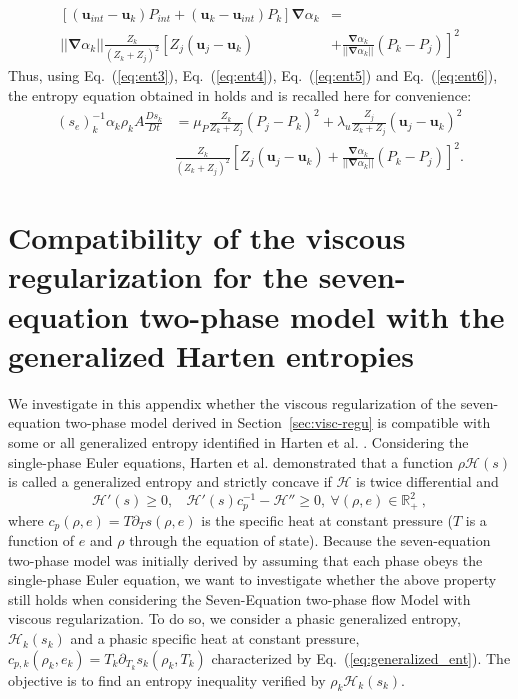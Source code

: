 \documentclass[preprint,10pt]{elsarticle}
\newcommand{\grad}{\mbold{\nabla}}
\newcommand{\mbold}[1]{\boldsymbol#1}
\newcommand{\eqt}[1]{Eq.~(\ref{#1})}                     %
\newcommand{\sct}[1]{Section~\ref{#1}}                   %
\begin{document}
\begin{appendices}
\begin{align}
\label{eq:ent6}
\left[ (\mbold u_{int}-\mbold u_k)P_{int} + (\mbold u_k-\mbold u_{int})P_k \right] \grad \alpha_k &=  \nonumber \\
|| \grad \alpha_k || \frac{Z_k }{\left( Z_k+Z_j \right)^2} \left[ Z_j (\mbold u_j-\mbold u_k)\right.&+\left.\frac{\grad \alpha_k}{|| \grad \alpha_k ||}(P_k-P_j)\right]^2
\end{align}
Thus, using \eqt{eq:ent3}, \eqt{eq:ent4}, \eqt{eq:ent5} and \eqt{eq:ent6}, the entropy equation obtained in \cite{SEM} holds and is recalled here for convenience:
\begin{align}
(s_{e})_k^{-1} \alpha_k \rho_k A \frac{Ds_k}{Dt} &= \mu_P \frac{Z_k}{Z_k+Z_j} (P_j - P_k)^2 + \lambda_u \frac{Z_j}{Z_k+Z_j} (\mbold u_j -\mbold  u_k)^2 \nonumber
\\
& \frac{Z_k}{\left( Z_k+Z_j \right)^2} \left[ Z_j (\mbold u_j-\mbold u_k)+\frac{\grad \alpha_k}{|| \grad \alpha_k ||}(P_k-P_j)\right]^2. \nonumber
\end{align}
\section{Compatibility of the viscous regularization for the seven-equation two-phase model with the generalized Harten entropies}\label{app:harden}
We investigate in this appendix whether the viscous regularization of the seven-equation two-phase model derived in \sct{sec:visc-regu} is compatible with some or all generalized entropy identified in Harten et al. \cite{Harten}. Considering the single-phase Euler equations, Harten et al. \cite{Harten} demonstrated that a function $\rho \mathscr{H}(s)$ is called a generalized entropy and strictly concave if $\mathscr{H}$ is twice differential and
%
\begin{equation}\label{eq:generalized_ent}
\mathscr{H}' (s)  \geq 0, \ \ \ \ \mathscr{H}'(s)c_p^{-1} - \mathscr{H}'' \geq 0, \ \forall \left( \rho, e \right) \in \mathbb{R}_+^2 \ ,
\end{equation}
%
where $c_p \left( \rho, e \right) = T \partial_T s \left( \rho, e \right)$ is the specific heat at constant pressure ($T$ is a function of $e$ and $\rho$ through the equation of state). Because the seven-equation two-phase model was initially derived by assuming that each phase obeys the single-phase Euler equation, we want to investigate whether the above property still holds when considering the Seven-Equation two-phase flow Model with viscous regularization. To do so, we consider a phasic generalized entropy, $\mathscr{H}_k(s_k)$ and a phasic specific heat at constant pressure, $c_{p,k} \left( \rho_k, e_k \right) = T_k \partial_{T_k} s_k \left( \rho_k, T_k \right)$ characterized by \eqt{eq:generalized_ent}. The objective is to find an entropy inequality verified by $\rho_k \mathscr{H}_k(s_k)$.


\end{appendices}
\end{document}
